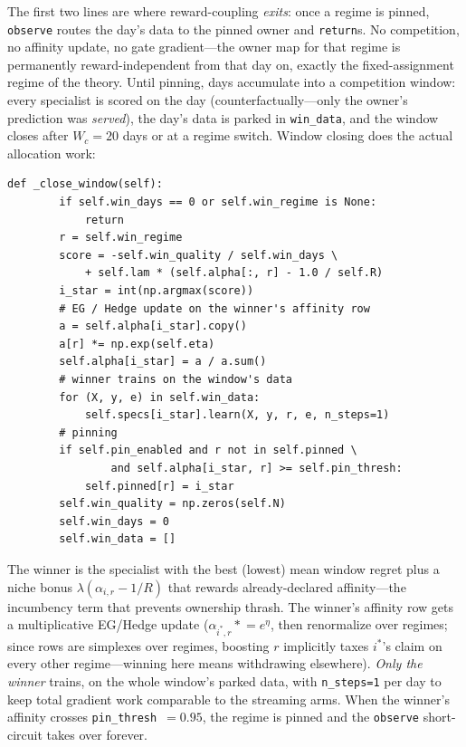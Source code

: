 \documentclass[11pt,a4paper]{article}
\theoremstyle{definition}
\theoremstyle{plain}
\begin{document}
The first two lines are where reward-coupling \emph{exits}: once a regime is
pinned, \texttt{observe} routes the day's data to the pinned owner and
\texttt{return}s. No competition, no affinity update, no gate
gradient---the owner map for that regime is permanently
reward-independent from that day on, exactly the fixed-assignment regime of
the theory. Until pinning, days accumulate into a competition window: every
specialist is scored on the day (counterfactually---only the owner's
prediction was \emph{served}), the day's data is parked in
\texttt{win\_data}, and the window closes after $W_c = 20$ days or at a
regime switch. Window closing does the actual allocation work:

\begin{lstlisting}[caption={\texttt{RISPArm.\_close\_window}: EG update, winner-trains, pinning (\texttt{risp.py}).},label={lst:dd6-nmclose}]
    def _close_window(self):
        if self.win_days == 0 or self.win_regime is None:
            return
        r = self.win_regime
        score = -self.win_quality / self.win_days \
            + self.lam * (self.alpha[:, r] - 1.0 / self.R)
        i_star = int(np.argmax(score))
        # EG / Hedge update on the winner's affinity row
        a = self.alpha[i_star].copy()
        a[r] *= np.exp(self.eta)
        self.alpha[i_star] = a / a.sum()
        # winner trains on the window's data
        for (X, y, e) in self.win_data:
            self.specs[i_star].learn(X, y, r, e, n_steps=1)
        # pinning
        if self.pin_enabled and r not in self.pinned \
                and self.alpha[i_star, r] >= self.pin_thresh:
            self.pinned[r] = i_star
        self.win_quality = np.zeros(self.N)
        self.win_days = 0
        self.win_data = []
\end{lstlisting}

The winner is the specialist with the best (lowest) mean window regret plus
a niche bonus $\lambda(\alpha_{i,r} - 1/R)$ that rewards already-declared
affinity---the incumbency term that prevents ownership thrash. The winner's
affinity row gets a multiplicative EG/Hedge update
($\alpha_{i^*, r} \mathrel{*}= e^{\eta}$, then renormalize over regimes;
since rows are simplexes over regimes, boosting $r$ implicitly taxes
$i^*$'s claim on every other regime---winning here means withdrawing
elsewhere). \emph{Only the winner} trains, on the whole window's parked
data, with \texttt{n\_steps=1} per day to keep total gradient work
comparable to the streaming arms. When the winner's affinity crosses
\texttt{pin\_thresh}~$=0.95$, the regime is pinned and the
\texttt{observe} short-circuit takes over forever.
\end{document}

